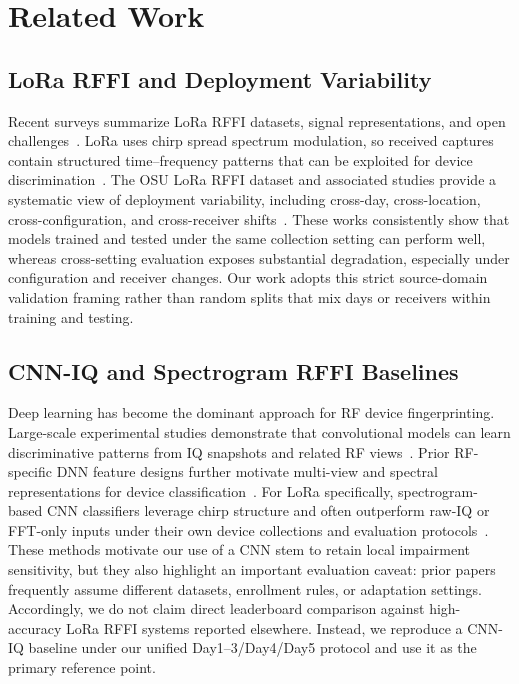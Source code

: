 \section{Related Work}
\label{sec:related}

\subsection{LoRa RFFI and Deployment Variability}
Recent surveys summarize LoRa RFFI datasets, signal representations, and open challenges~\cite{ahmed2024lora_rffi_survey,xie2024rffi_iot_survey}.
LoRa uses chirp spread spectrum modulation, so received captures contain structured time--frequency patterns that can be exploited for device discrimination~\cite{shen2021lora_spectrogram_cnn,alshawabka2021deeplora}.
The OSU LoRa RFFI dataset and associated studies provide a systematic view of deployment variability, including cross-day, cross-location, cross-configuration, and cross-receiver shifts~\cite{elmaghbub2021lora_wild,hamdaoui2022deeplearning,elmaghbub2021dataset_release}.
These works consistently show that models trained and tested under the same collection setting can perform well, whereas cross-setting evaluation exposes substantial degradation, especially under configuration and receiver changes.
Our work adopts this strict source-domain validation framing rather than random splits that mix days or receivers within training and testing.

\subsection{CNN-IQ and Spectrogram RFFI Baselines}
Deep learning has become the dominant approach for RF device fingerprinting.
Large-scale experimental studies demonstrate that convolutional models can learn discriminative patterns from IQ snapshots and related RF views~\cite{jian2020deeplearning_rf_fingerprinting,sankhe2019oracle}.
Prior RF-specific DNN feature designs further motivate multi-view and spectral representations for device classification~\cite{hamdaoui2020deep_nn_features}.
For LoRa specifically, spectrogram-based CNN classifiers leverage chirp structure and often outperform raw-IQ or FFT-only inputs under their own device collections and evaluation protocols~\cite{shen2021lora_spectrogram_cnn,alshawabka2021deeplora}.
These methods motivate our use of a CNN stem to retain local impairment sensitivity, but they also highlight an important evaluation caveat: prior papers frequently assume different datasets, enrollment rules, or adaptation settings.
Accordingly, we do not claim direct leaderboard comparison against high-accuracy LoRa RFFI systems reported elsewhere.
Instead, we reproduce a CNN-IQ baseline under our unified Day1--3/Day4/Day5 protocol and use it as the primary reference point.

